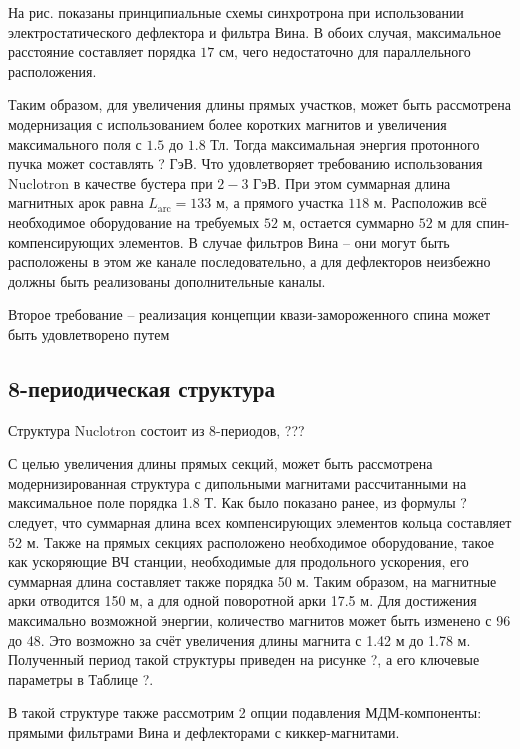 \noindent На рис. показаны принципиальные схемы синхротрона при использовании электростатического дефлектора и фильтра Вина. В обоих случая, максимальное расстояние составляет порядка $17$ см, чего недостаточно для параллельного расположения.

\par Таким образом, для увеличения длины прямых участков, может быть рассмотрена модернизация с использованием более коротких магнитов  и увеличения максимального поля с $1.5$ до $1.8$ Тл. Тогда максимальная энергия протонного пучка может составлять ? ГэВ. Что удовлетворяет требованию использования Nuclotron в качестве бустера при $2-3$ ГэВ. При этом суммарная длина магнитных арок равна $L_\textrm{arc} = 133$ м, а прямого участка $118$ м. Расположив всё необходимое оборудование на требуемых $52$ м, остается суммарно $52$ м для спин-компенсирующих элементов. В случае фильтров Вина – они могут быть расположены в этом же канале последовательно, а для дефлекторов неизбежно должны быть реализованы дополнительные каналы.

\par Второе требование – реализация концепции квази-замороженного спина может быть удовлетворено путем 

	\subsection{8-периодическая структура}\label{sec:EDM/optics/8period}
\par Структура Nuclotron состоит из 8-периодов, ???
 
 \par С целью увеличения длины прямых секций, может быть рассмотрена модернизированная структура с дипольными магнитами рассчитанными на максимальное поле порядка 1.8 Т. Как было показано ранее, из формулы ? следует, что суммарная длина всех компенсирующих элементов кольца составляет 52 м. Также на прямых секциях расположено необходимое оборудование, такое как ускоряющие ВЧ станции, необходимые для продольного ускорения, его суммарная длина составляет также порядка 50 м. Таким образом, на магнитные арки отводится 150 м, а для одной поворотной арки 17.5 м. Для достижения максимально возможной энергии, количество магнитов может быть изменено с 96 до 48. Это возможно за счёт увеличения длины магнита с 1.42 м до 1.78 м. Полученный период такой структуры приведен на рисунке ?, а его ключевые параметры в Таблице ?.

В такой структуре также рассмотрим 2 опции подавления МДМ-компоненты: прямыми фильтрами Вина и дефлекторами с киккер-магнитами.

